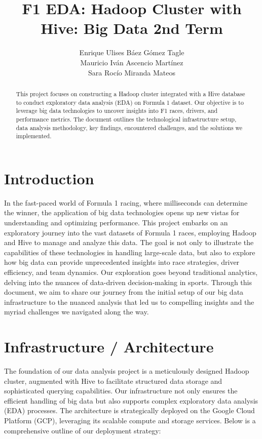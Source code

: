 \documentclass{article}
\begin{document}
\title{F1 EDA: Hadoop Cluster with Hive: Big Data 2nd Term}

\author{Enrique Ulises Báez Gómez Tagle \\ Mauricio Iván Ascencio Martínez\\ Sara Rocío Miranda Mateos}

\maketitle

\begin{abstract}
This project focuses on constructing a Hadoop cluster integrated with a Hive database to conduct exploratory data analysis (EDA) on Formula 1 dataset. Our objective is to leverage big data technologies to uncover insights into F1 races, drivers, and performance metrics. The document outlines the technological infrastructure setup, data analysis methodology, key findings, encountered challenges, and the solutions we implemented.
\end{abstract}

\tableofcontents
\newpage

\section{Introduction}
In the fast-paced world of Formula 1 racing, where milliseconds can determine the winner, the application of big data technologies opens up new vistas for understanding and optimizing performance. This project embarks on an exploratory journey into the vast datasets of Formula 1 races, employing Hadoop and Hive to manage and analyze this data. The goal is not only to illustrate the capabilities of these technologies in handling large-scale data, but also to explore how big data can provide unprecedented insights into race strategies, driver efficiency, and team dynamics. Our exploration goes beyond traditional analytics, delving into the nuances of data-driven decision-making in sports. Through this document, we aim to share our journey from the initial setup of our big data infrastructure to the nuanced analysis that led us to compelling insights and the myriad challenges we navigated along the way.

\section{Infrastructure / Architecture}
The foundation of our data analysis project is a meticulously designed Hadoop cluster, augmented with Hive to facilitate structured data storage and sophisticated querying capabilities. Our infrastructure not only ensures the efficient handling of big data but also supports complex exploratory data analysis (EDA) processes. The architecture is strategically deployed on the Google Cloud Platform (GCP), leveraging its scalable compute and storage services. Below is a comprehensive outline of our deployment strategy:
\end{document}
